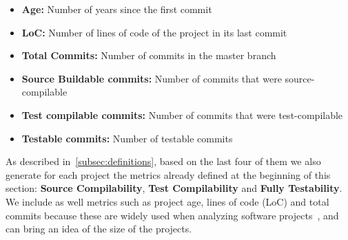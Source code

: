 \begin{itemize}
    \item \textbf{Age:} Number of years since the first commit
    \item \textbf{LoC:} Number of lines of code of the project in its last commit
    \item \textbf{Total Commits:} Number of commits in the master branch
    \item \textbf{Source Buildable commits:} Number of commits that were source-compilable
    \item \textbf{Test compilable commits:} Number of commits that were test-compilable
    \item \textbf{Testable commits:} Number of testable commits
\end{itemize}


As described in~\ref{subsec:definitions}, based on the last four of them we also generate for each project the metrics already defined at the beginning of this section: \textbf{Source Compilability}, \textbf{Test Compilability} and \textbf{Fully Testability}.
We include as well metrics such as project age, lines of code (LoC) and total commits because these are widely used when analyzing software projects~\cite{yamashita2015revisiting,mannan2016understanding,rosen2015commit}, and can bring an idea of the size of the projects. 


